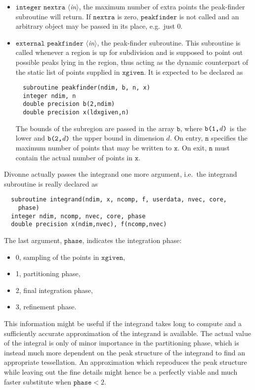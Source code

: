\documentclass[12pt]{article}
\newcommand\ie{i.e.\ }
\newcommand\eg{e.g.\ }
\newcommand\Code[1]{\ensuremath{\texttt{#1}}}
\newcommand\Var[1]{\ensuremath{\mathit{#1}}}
\newcommand\VarIn[1]{\item\Code{#1} \textit{$\langle$in\/$\rangle$},}
\begin{document}
\begin{itemize}
\VarIn{integer nextra}
the maximum number of extra points the peak-finder subroutine will
return.  If \Code{nextra} is zero, \Code{peakfinder} is not called
and an arbitrary object may be passed in its place, \eg just 0.

\VarIn{external peakfinder}
the peak-finder subroutine.  This subroutine is called whenever a region 
is up for subdivision and is supposed to point out possible peaks lying 
in the region, thus acting as the dynamic counterpart of the static list 
of points supplied in \Code{xgiven}.  It is expected to be declared as
\begin{verbatim}
  subroutine peakfinder(ndim, b, n, x)
  integer ndim, n
  double precision b(2,ndim)
  double precision x(ldxgiven,n)
\end{verbatim}
The bounds of the subregion are passed in the array \Code{b}, where 
\Code{b(1,\Var{d})} is the lower and \Code{b(2,\Var{d})} the upper 
bound in dimension \Var{d}.  On entry, \Code{n} specifies the maximum 
number of points that may be written to \Code{x}.  On exit, \Code{n} 
must contain the actual number of points in \Code{x}.
\end{itemize}
Divonne actually passes the integrand one more argument, \ie the 
integrand subroutine is really declared as
\begin{verbatim}
  subroutine integrand(ndim, x, ncomp, f, userdata, nvec, core,
    phase)
  integer ndim, ncomp, nvec, core, phase
  double precision x(ndim,nvec), f(ncomp,nvec)
\end{verbatim}
The last argument, \Code{phase}, indicates the integration phase:
\begin{itemize}
\item 0, sampling of the points in \Code{xgiven},
\item 1, partitioning phase,
\item 2, final integration phase,
\item 3, refinement phase.
\end{itemize}
This information might be useful if the integrand takes long to compute
and a sufficiently accurate approximation of the integrand is available. 
The actual value of the integral is only of minor importance in the
partitioning phase, which is instead much more dependent on the peak
structure of the integrand to find an appropriate tessellation.  An
approximation which reproduces the peak structure while leaving out the
fine details might hence be a perfectly viable and much faster
substitute when $\Code{phase} < 2$.
\end{document}

